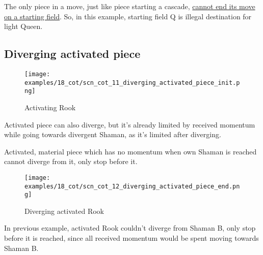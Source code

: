 The only piece in a move, just like piece starting a cascade,
\hyperref[fig:scn_mv_46_static_move_is_illegal_init]{cannot end its move on a starting field}.
So, in this example, starting field Q is illegal destination for light Queen.

\clearpage %

\subsection*{Diverging activated piece}
\label{sec:Conquest of Tlalocan/Divergence/Diverging activated piece}

\vspace*{-1.4\baselineskip}
\noindent
\begin{figure}[!h]
\texttt{[image: examples/18\_cot/scn\_cot\_11\_diverging\_activated\_piece\_init.png]}
\vspace*{-1.3\baselineskip}
\caption{Activating Rook}
\label{fig:scn_cot_11_diverging_activated_piece_init}
\end{figure}

\vspace*{-0.4\baselineskip}
Activated piece can also diverge, but it's already limited by received momentum
while going towards divergent Shaman, as it's limited after diverging.

Activated, material piece which has no momentum when own Shaman is reached cannot
diverge from it, only stop before it.

\clearpage %

\vspace*{-2.1\baselineskip}
\noindent
\begin{figure}[!h]
\texttt{[image: examples/18\_cot/scn\_cot\_12\_diverging\_activated\_piece\_end.png]}
\vspace*{-1.3\baselineskip}
\caption{Diverging activated Rook}
\label{fig:scn_cot_12_diverging_activated_piece_end}
\end{figure}

\vspace*{-0.4\baselineskip}
In previous example, activated Rook couldn't diverge from Shaman B, only stop before
it is reached, since all received momentum would be spent moving towards Shaman B.

